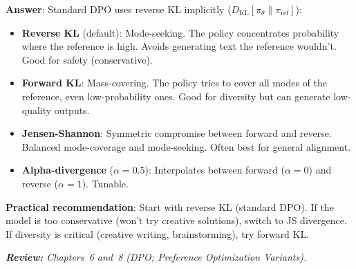 \begin{questionbox}
\textbf{Answer}: Standard DPO uses reverse KL implicitly ($D_\text{KL}[\pi_\theta \| \pi_\text{ref}]$):

\begin{itemize}
  \item \textbf{Reverse KL} (default): Mode-seeking. The policy concentrates probability where the reference is high. Avoids generating text the reference wouldn’t. Good for safety (conservative).
  \item \textbf{Forward KL}: Mass-covering. The policy tries to cover all modes of the reference, even low-probability ones. Good for diversity but can generate low-quality outputs.
  \item \textbf{Jensen-Shannon}: Symmetric compromise between forward and reverse. Balanced mode-coverage and mode-seeking. Often best for general alignment.
  \item \textbf{Alpha-divergence} ($\alpha=0.5$): Interpolates between forward ($\alpha=0$) and reverse ($\alpha=1$). Tunable.
\end{itemize}

\textbf{Practical recommendation}: Start with reverse KL (standard DPO). If the model is too conservative (won’t try creative solutions), switch to JS divergence. If diversity is critical (creative writing, brainstorming), try forward KL.

\emph{\textbf{Review:} Chapters~6 and~8 (DPO; Preference Optimization Variants).}
\end{questionbox}

